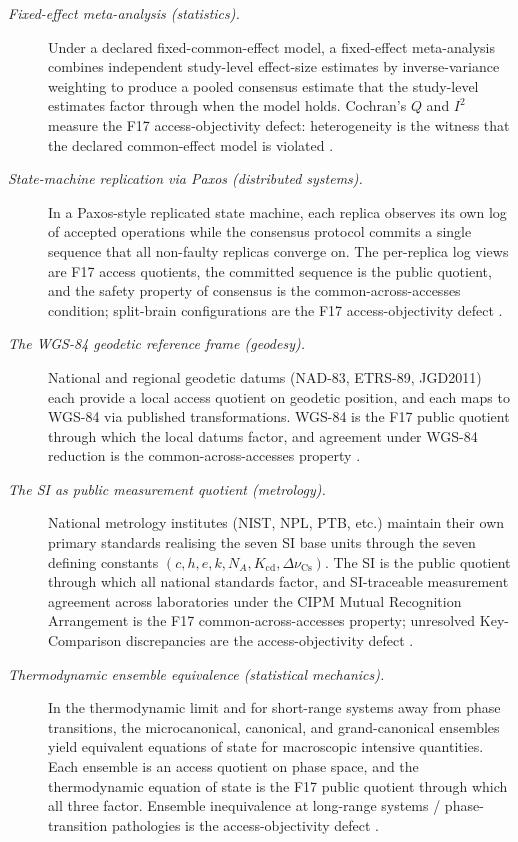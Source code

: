 \documentclass[11pt]{article}
\theoremstyle{definition}
\begin{document}
\begin{description}
\item[\emph{Fixed-effect meta-analysis (statistics).}]
Under a declared fixed-common-effect model, a fixed-effect
meta-analysis combines independent study-level effect-size
estimates by inverse-variance weighting to produce a pooled
consensus estimate that the study-level estimates factor through
when the model holds.  Cochran's \(Q\) and \(I^2\) measure the
F17 access-objectivity defect: heterogeneity is the witness that
the declared common-effect model is violated
\citep{HedgesOlkin1985MetaAnalysis}.

\item[\emph{State-machine replication via Paxos (distributed
systems).}]
In a Paxos-style replicated state machine, each replica observes
its own log of accepted operations while the consensus protocol
commits a single sequence that all non-faulty replicas converge
on.  The per-replica log views are F17 access quotients, the
committed sequence is the public quotient, and the safety property
of consensus is the common-across-accesses condition; split-brain
configurations are the F17 access-objectivity defect
\citep{Lamport1998PartTimeParliament}.

\item[\emph{The {WGS-84} geodetic reference frame (geodesy).}]
National and regional geodetic datums (NAD-83, ETRS-89, JGD2011)
each provide a local access quotient on geodetic position, and
each maps to WGS-84 via published transformations.  WGS-84 is the
F17 public quotient through which the local datums factor, and
agreement under WGS-84 reduction is the common-across-accesses
property
\citep{NGA2014WGS84}.

\item[\emph{The {SI} as public measurement quotient (metrology).}]
National metrology institutes (NIST, NPL, PTB, etc.) maintain
their own primary standards realising the seven SI base units
through the seven defining constants
\((c,h,e,k,N_A,K_{\mathrm{cd}},\Delta\nu_{\mathrm{Cs}})\).  The SI
is the public quotient through which all national standards
factor, and SI-traceable measurement agreement across laboratories
under the CIPM Mutual Recognition Arrangement is the F17
common-across-accesses property; unresolved Key-Comparison
discrepancies are the access-objectivity defect
\citep{BIPM2019SIBrochure}.

\item[\emph{Thermodynamic ensemble equivalence (statistical
mechanics).}]
In the thermodynamic limit and for short-range systems away from
phase transitions, the microcanonical, canonical, and grand-canonical
ensembles yield equivalent equations of state for macroscopic
intensive quantities.  Each ensemble is an access quotient on
phase space, and the thermodynamic equation of state is the F17
public quotient through which all three factor.  Ensemble
inequivalence at long-range systems / phase-transition
pathologies is the access-objectivity defect
\citep{Ruelle1969StatisticalMechanics}.
\end{description}
\end{document}
